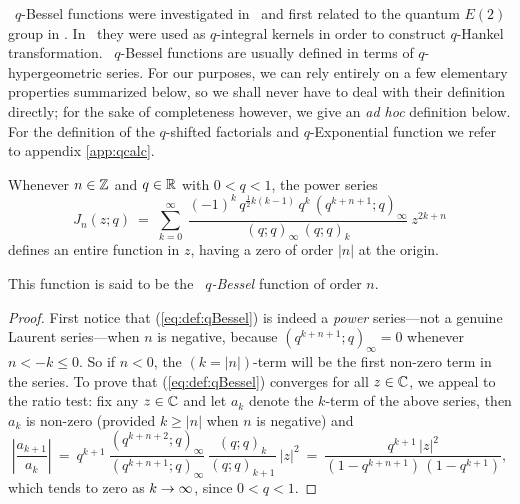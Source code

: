 

\begin{abs_chp}
\Little\ $q$-Bessel functions were investigated in \cite{KoornwSwartt,Swarttouw}\
and first related to the quantum $E(2)$ group in \cite{Koelink:QE2,VaksKor:QE2}\@.
In \cite{KoornwSwartt}\ they were used as $q$-integral kernels
in order to construct $q$-Hankel transformation.
\Little\ $q$-Bessel functions are usually defined in terms of $q$-hypergeometric series.
For our purposes, we can rely entirely on a few elementary properties summarized below,
so we shall never have to deal with their definition directly;
for the sake of completeness however, we give an {\em ad hoc\/} definition below.
For the definition of the $q$-shifted factorials and $q$-Exponential function
we refer to appendix \ref{app:qcalc}\@.
\end{abs_chp}



\begin{lemma_sec} \label{lemma:def:qBessel}
Whenever\/ $n \in \mathbb{Z}$ and\/ $q\in\mathbb{R}$ with\/ $0<q<1$, the power series
\begin{equation}\label{eq:def:qBessel}
  J_n(z;q) \:=\; \sum_{k=0}^{\infty} \:
  \frac{(-1)^k\,q^{\frac{1}{2}k(k-1)}\,q^k\,(q^{k+n+1};q)_\infty}{(q;q)_\infty \,(q;q)_k}\:z^{2k+n}
\end{equation}
defines an entire function in\/ $z$, having a zero of order\/ $|n|$ at the origin.

{\rm This function is said to be the {\em \little\ $q$-Bessel\/} function of order $n$.}
\end{lemma_sec}

\begin{proof}
First notice that (\ref{eq:def:qBessel}) is indeed a {\em power\/}
series---not a genuine Laurent series---when $n$ is negative,
because $(q^{k+n+1};q)_\infty=0$ whenever $n < -k \leq 0$.
So if $n<0$, the $(k=|n|)$-term will be the first non-zero term
in the series.
To prove that (\ref{eq:def:qBessel}) converges for all $z\in \mathbb{C}$,
we appeal to the ratio test: fix any $z\in \mathbb{C}$ and let
$a_k$ denote the $k$-term of the above series, then $a_k$
is non-zero (provided $k\geq|n|$ when $n$ is negative) and
$$ \left| \frac{a_{k+1}}{a_k} \right| \:=\:
    q^{k+1}\: \frac{(q^{k+n+2};q)_\infty}{(q^{k+n+1};q)_\infty} \:
              \frac{(q;q)_k}{(q;q)_{k+1}}\: |z|^2
    \:=\: \frac{q^{k+1}\, |z|^2}{(1-q^{k+n+1})\, (1- q^{k+1})},  $$
which tends to zero as $k\rightarrow\infty$, since $0<q<1$.
\end{proof}




